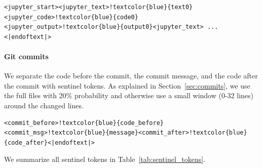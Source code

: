 \documentclass[10pt]{article} %
\begin{document}
\begin{Verbatim}[commandchars=!\{\}]
<jupyter_start><jupyter_text>!textcolor{blue}{text0}<jupyter_code>!textcolor{blue}{code0}
<jupyter_output>!textcolor{blue}{output0}<jupyter_text> ... <|endoftext|> 
\end{Verbatim}



\paragraph{Git commits} We separate the code before the commit, the commit message, and the code after the commit with sentinel tokens. As explained in Section~\ref{sec:commits}, we use the full files with 20\% probability and otherwise use a small window (0-32 lines) around the changed lines. 

\begin{Verbatim}[commandchars=!\{\}]
<commit_before>!textcolor{blue}{code_before}<commit_msg>!textcolor{blue}{message}<commit_after>!textcolor{blue}{code_after}<|endoftext|>
\end{Verbatim}

We summarize all sentinel tokens in Table~\ref{tab:sentinel_tokens}. 
\end{document}
